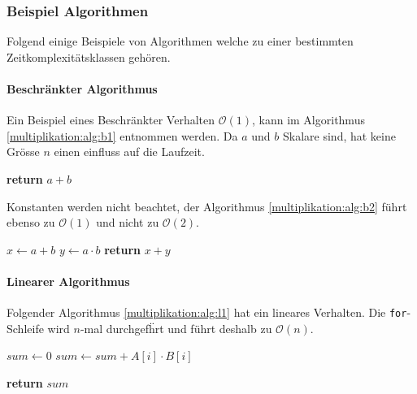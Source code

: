 \subsubsection{Beispiel Algorithmen}

Folgend einige Beispiele von Algorithmen welche zu einer bestimmten Zeitkomplexit\"atsklassen geh\"oren.
\paragraph{Beschr\"ankter Algorithmus}

Ein Beispiel eines Beschr\"ankter Verhalten $\mathcal{O}(1)$, kann im Algorithmus \ref{multiplikation:alg:b1} entnommen werden. Da $a$ und $b$ Skalare sind, hat keine Gr\"osse $n$ einen einfluss auf die Laufzeit.

\begin{algorithm}\caption{}
	\label{multiplikation:alg:b1}
	\setlength{\lineskip}{7pt}
	\begin{algorithmic}
		\State \textbf{return} $a+b$
		\EndFunction
	\end{algorithmic}
\end{algorithm}

Konstanten werden nicht beachtet, der Algorithmus \ref{multiplikation:alg:b2} f\"uhrt ebenso zu  $\mathcal{O}(1)$ und nicht zu $\mathcal{O}(2)$.

\begin{algorithm}\caption{}
	\label{multiplikation:alg:b2}
	\setlength{\lineskip}{7pt}
	\begin{algorithmic}
		\Function{B2}{$a, b$}
		\State $ x \gets a+b $
		\State $ y \gets a \cdot b $
		\State \textbf{return} $x+y$
		\EndFunction
	\end{algorithmic}
\end{algorithm}

\paragraph{Linearer Algorithmus}

Folgender Algorithmus \ref{multiplikation:alg:l1} hat ein lineares Verhalten.
Die \texttt{for}-Schleife wird $n$-mal durchgef\"hrt und f\"uhrt deshalb zu $\mathcal{O}(n)$.

\begin{algorithm}\caption{}
	\setlength{\lineskip}{7pt}
	\begin{algorithmic}
		\label{multiplikation:alg:l1}
		\Function{L}{$\mathbf{a}, \mathbf{b}$,n}
		\State $ sum \gets 0$
		\For{$i = 0,1,2 \dots,n$}
		\State $ sum \gets sum + A[i] \cdot B[i] $
		\EndFor
		
		\State \textbf{return} $sum$
		
		\EndFunction
	\end{algorithmic}
\end{algorithm}


